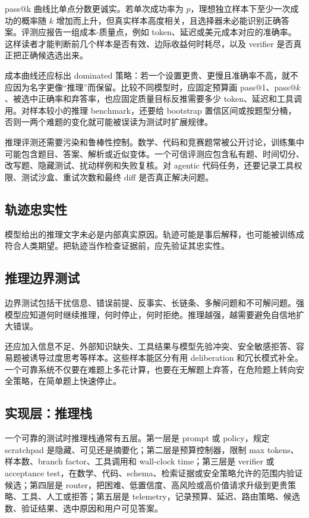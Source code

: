 \documentclass[UTF8,zihao=-4,openany]{ctexbook}
\begin{document}
pass@k 曲线比单点分数更诚实。若单次成功率为 $p$，理想独立样本下至少一次成功的概率随 $k$ 增加而上升，但真实样本高度相关，且选择器未必能识别正确答案。评测应报告一组成本-质量点，例如 token、延迟或美元成本对应的准确率。这样读者才能判断前几个样本是否有效、边际收益何时耗尽，以及 verifier 是否真正把正确候选选出来。

成本曲线还应标出 dominated 策略：若一个设置更贵、更慢且准确率不高，就不应因为名字更像“推理”而保留。比较不同模型时，应固定预算画 pass@1、pass@$k$、被选中正确率和弃答率，也应固定质量目标反推需要多少 token、延迟和工具调用。对样本较小的推理 benchmark，还要给 bootstrap 置信区间或按题型分桶，否则一两个难题的变化就可能被误读为测试时扩展规律。

推理评测还需要污染和鲁棒性控制。数学、代码和竞赛题常被公开讨论，训练集中可能包含题目、答案、解析或近似变体。一个可信评测应包含私有题、时间切分、改写题、隐藏测试、扰动样例和失败复核。对 agentic 代码任务，还要记录工具权限、测试沙盒、重试次数和最终 diff 是否真正解决问题。

\subsection{轨迹忠实性}
模型给出的推理文字未必是内部真实原因。轨迹可能是事后解释，也可能被训练成符合人类期望。把轨迹当作检查证据前，应先验证其忠实性。

\subsection{推理边界测试}
边界测试包括干扰信息、错误前提、反事实、长链条、多解问题和不可解问题。强模型应知道何时继续推理，何时停止，何时拒绝。推理越强，越需要避免自信地扩大错误。

还应加入信息不足、外部知识缺失、工具结果与模型先验冲突、安全敏感拒答、容易题被诱导过度思考等样本。这些样本能区分有用 deliberation 和冗长模式补全。一个可靠系统不仅要在难题上多花计算，也要在无解题上弃答，在危险题上转向安全策略，在简单题上快速停止。

\subsection{实现层：推理栈}
一个可靠的测试时推理栈通常有五层。第一层是 prompt 或 policy，规定 scratchpad 是隐藏、可见还是摘要化；第二层是预算控制器，限制 max tokens、样本数、branch factor、工具调用和 wall-clock time；第三层是 verifier 或 acceptance test，在数学、代码、schema、检索证据或安全策略允许的范围内验证候选；第四层是 router，把困难、低置信度、高风险或高价值请求升级到更贵策略、工具、人工或拒答；第五层是 telemetry，记录预算、延迟、路由策略、候选数、验证结果、选中原因和用户可见答案。
\end{document}
